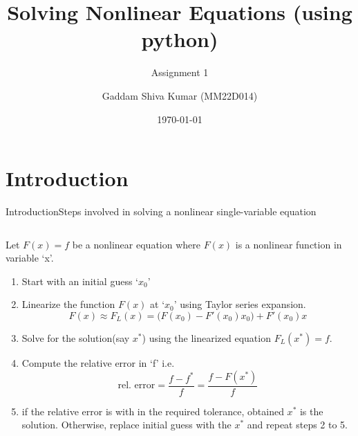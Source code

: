 \documentclass{beamer}
\title[Solving Nonlinear Equations]{Solving Nonlinear Equations \small{(using python)}}
\subtitle{Assignment 1}
\author[Gaddam Shiva Kumar]{Gaddam Shiva Kumar (MM22D014)}
\institute[]{ME7227 : Nonlinear Finite Element Analysis of Solid Continua}
\date{\today}
\begin{document}
\begin{frame}
\maketitle
\end{frame}



\section{Introduction}


\begin{frame}{Introduction}{Steps involved in solving a nonlinear single-variable equation}
    \begin{columns}
        \begin{block}{\footnotesize Let $F(x)=f$ be a nonlinear equation where $F(x)$ is a nonlinear function in variable `x'.}
            \begin{enumerate}
                \footnotesize
                \item Start with an initial guess `$x_0$'
                \item Linearize the function $F(x)$ at `$x_0$' using Taylor series expansion.
                \[
                    F(x)\approx F_L(x)=\big(F(x_0)-F'(x_0) x_0\big)+F'(x_0) x
                \]
                \item Solve for the solution(say $x^*$) using the linearized equation $F_L(x^*)=f$.
                \item Compute the relative error in `f' i.e.
                \[
                    \text{rel. error} = \frac{f-f^*}{f} = \frac{f-F(x^*)}{f}
                \]
                \item if the relative error is with in the required tolerance, obtained $x^*$ is the solution. Otherwise, replace initial guess with the $x^*$ and repeat steps 2 to 5.
            \end{enumerate}
        \end{block}
    \end{columns}
    \vfill
\end{frame}
\end{document}
